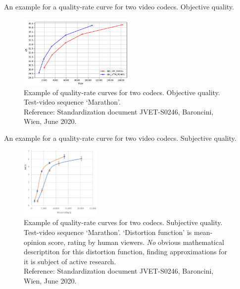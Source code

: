 \begin{frame}{An example for a quality-rate curve for two video codecs. Objective quality.}
\begin{figure}
\centering
\includegraphics[width=0.50\textwidth]{RD_IV/Marathon_Obj_Ausschnitt.png}
\captionsetup{labelformat=empty}
\caption{Example of quality-rate curves for two codecs. Objective quality. Test-video sequence `Marathon'.
\\
Reference: Standardization document  JVET-S0246, Baroncini, Wien, June 2020. 
}
\end{figure}
\end{frame}



\begin{frame}{An example for a quality-rate curve for two video codecs. Subjective quality.}
\begin{figure}
\centering
\includegraphics[width=0.35\textwidth]{RD_IV/MarathonSubj_Ausschnitt.png}
\captionsetup{labelformat=empty}
\caption{Example of quality-rate curves for two codecs. Subjective quality. Test-video sequence `Marathon'. `Distortion function' 
is mean-opinion score,  rating by human viewers.  \textit{No} obvious mathematical descriptiton for this distortion function, finding 
approximations for it is subject of active research. %
\\
Reference: Standardization document  JVET-S0246, Baroncini, Wien, June 2020. 
 }
\end{figure}
\end{frame}



